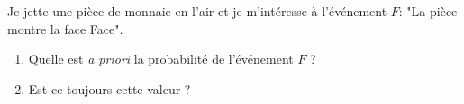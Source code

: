 
Je jette une pièce de monnaie en l'air et je m'intéresse à l'événement $F$: "La pièce montre la face Face".
\begin{enumerate}
\item Quelle est \textit{a priori} la probabilité de l'événement $F$ ?
\item Est ce toujours cette valeur ?
\end{enumerate}

